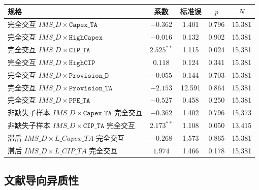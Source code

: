 \documentclass[11pt]{article}
\begin{document}
\begin{center}
\begin{threeparttable}
\caption{财务交叉：\(IMS\_D\) 交互（摘录）}
\begin{tabular}{lcccc}
\toprule
规格 & 系数 & 标准误 & \(p\) & \(N\) \\
\midrule
完全交互 \(IMS\_D\times\texttt{Capex\_TA}\) & \(-0.362\) & 1.401 & 0.796 & 15,381 \\
完全交互 \(IMS\_D\times\texttt{HighCapex}\) & \(-0.016\) & 0.132 & 0.902 & 15,381 \\
完全交互 \(IMS\_D\times\texttt{CIP\_TA}\) & \(2.525^{**}\) & 1.115 & 0.024 & 15,381 \\
完全交互 \(IMS\_D\times\texttt{HighCIP}\) & \(0.118\) & 0.124 & 0.341 & 15,381 \\
完全交互 \(IMS\_D\times\texttt{Provision\_D}\) & \(-0.055\) & 0.144 & 0.703 & 15,381 \\
完全交互 \(IMS\_D\times\texttt{Provision\_TA}\) & \(-2.153\) & 12.591 & 0.864 & 15,381 \\
完全交互 \(IMS\_D\times\texttt{PPE\_TA}\) & \(-0.527\) & 0.458 & 0.250 & 15,381 \\
非缺失子样本 \(IMS\_D\times\texttt{Capex\_TA}\) 完全交互 & \(-0.362\) & 1.402 & 0.796 & 15,373 \\
非缺失子样本 \(IMS\_D\times\texttt{CIP\_TA}\) 完全交互 & \(2.173^{**}\) & 1.108 & 0.050 & 13,415 \\
滞后 \(IMS\_D\times L\_Capex\_TA\) 完全交互 & \(-0.268\) & 1.573 & 0.865 & 15,381 \\
滞后 \(IMS\_D\times L\_CIP\_TA\) 完全交互 & \(1.974\) & 1.466 & 0.178 & 15,381 \\
\bottomrule
\end{tabular}
\end{threeparttable}
\end{center}

\subsection{文献导向异质性}
\end{document}
